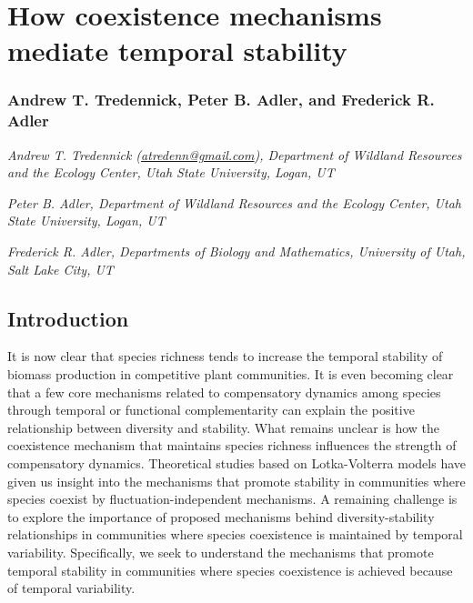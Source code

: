 \documentclass[12pt,]{article}
\author{}
\date{}
\begin{document}
\normalsize


\section{How coexistence mechanisms mediate temporal
stability}\label{how-coexistence-mechanisms-mediate-temporal-stability}

\subsubsection{Andrew T. Tredennick, Peter B. Adler, and Frederick R.
Adler}\label{andrew-t.-tredennick-peter-b.-adler-and-frederick-r.-adler}

\emph{Andrew T. Tredennick
(\href{mailto:atredenn@gmail.com}{\href{mailto:atredenn@gmail.com}{atredenn@gmail.com}}),
Department of Wildland Resources and the Ecology Center, Utah State
University, Logan, UT}

\emph{Peter B. Adler, Department of Wildland Resources and the Ecology
Center, Utah State University, Logan, UT}

\emph{Frederick R. Adler, Departments of Biology and Mathematics,
University of Utah, Salt Lake City, UT}

\subsection{Introduction}\label{introduction}

It is now clear that species richness tends to increase the temporal
stability of biomass production in competitive plant communities. It is
even becoming clear that a few core mechanisms related to compensatory
dynamics among species through temporal or functional complementarity
can explain the positive relationship between diversity and stability.
What remains unclear is how the coexistence mechanism that maintains
species richness influences the strength of compensatory dynamics.
Theoretical studies based on Lotka-Volterra models have given us insight
into the mechanisms that promote stability in communities where species
coexist by fluctuation-independent mechanisms. A remaining challenge is
to explore the importance of proposed mechanisms behind
diversity-stability relationships in communities where species
coexistence is maintained by temporal variability. Specifically, we seek
to understand the mechanisms that promote temporal stability in
communities where species coexistence is achieved because of temporal
variability.
\end{document}
